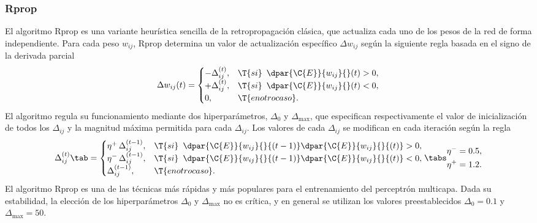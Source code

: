 %
\subsubsection{Rprop}
%
El algoritmo Rprop \cite{rprop} es una variante
heurística sencilla de la retropropagación clásica, que actualiza cada uno de
los pesos de la red de forma independiente.
Para cada peso $w_{ij}$, Rprop determina un valor de actualización
específico $\Delta{}w_{ij}$ según la siguiente regla basada en el
signo de la derivada parcial
%
\begin{align}
  \Delta{}w_{ij}(t) = 
  \begin{cases}
    -\Delta_{ij}^{(t)}, & \T{si}\,\,\,\dpar{\C{E}}{w_{ij}}{}(t) > 0, \\
    +\Delta_{ij}^{(t)}, & \T{si}\,\,\,\dpar{\C{E}}{w_{ij}}{}(t) < 0, \\
    0, & \T{en otro caso}.
  \end{cases}
\end{align}
%
El algoritmo regula su funcionamiento mediante dos hiperparámetros,
$\Delta_0$ y $\Delta_{\max}$, que especifican respectivamente el valor
de inicialización de todos los $\Delta_{ij}$ y la magnitud máxima
permitida para cada $\Delta_{ij}$.  Los valores de cada $\Delta_{ij}$
se modifican en cada iteración según la regla
%
\begin{align}
  \Delta{}_{ij}^{(t)} \tab = 
  \begin{cases}
    \eta^+\,\Delta_{ij}^{(t-1)}, & \T{si}\,\,\,\dpar{\C{E}}{w_{ij}}{} {(t-1)}
      \dpar{\C{E}}{w_{ij}}{} {(t)} > 0, \\
    \eta^-\,\Delta_{ij}^{(t-1)}, & \T{si}\,\,\,\dpar{\C{E}}{w_{ij}}{} {(t-1)}
      \dpar{\C{E}}{w_{ij}}{} {(t)} < 0, \\
    \Delta_{ij}^{(t-1)}, & \T{en otro caso}.
  \end{cases}
  \tabs
  \begin{split}
    \eta^-=0.5, \\
    \eta^+=1.2.
  \end{split}
\end{align}
%
El algoritmo Rprop es una de las técnicas más rápidas
y más populares para el entrenamiento del perceptrón multicapa.
Dada su estabilidad, la elección de los hiperparámetros
$\Delta_{0}$ y $\Delta_{\max}$ no es crítica, y en general
se utilizan los valores preestablecidos $\Delta_{0}=0.1$ y
$\Delta_{\max}=50$.
